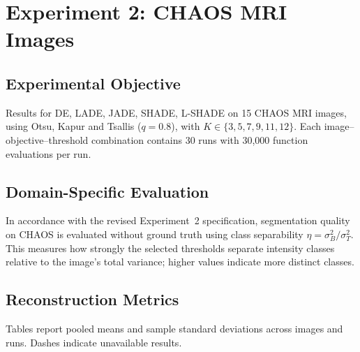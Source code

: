 \documentclass[review,authoryear]{elsarticle}
\begin{document}
\section{Experiment 2: CHAOS MRI Images}

\label{sec:experiment2}

\subsection{Experimental Objective}

Results for DE, LADE, JADE, SHADE, L-SHADE on 15 CHAOS MRI images, using Otsu, Kapur and Tsallis ($q=0.8$), with $K\in\{3,5,7,9,11,12\}$. Each image--objective--threshold combination contains 30 runs with 30,000 function evaluations per run.

\subsection{Domain-Specific Evaluation}

In accordance with the revised Experiment~2 specification, segmentation
quality on CHAOS is evaluated without ground truth using class separability
$\eta=\sigma_B^2/\sigma_T^2$. This measures how strongly the selected
thresholds separate intensity classes relative to the image's total variance;
higher values indicate more distinct classes.

\subsection{Reconstruction Metrics}

Tables report pooled means and sample standard deviations across images and runs. Dashes indicate unavailable results.
\end{document}
